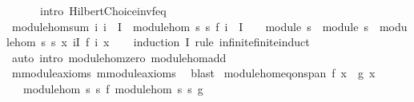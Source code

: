 \begin{isabellebody}
\ \ \ \ \ \ intro{\isacharbang}{\kern0pt}{\isacharcolon}{\kern0pt}\ Hilbert{\isacharunderscore}{\kern0pt}Choice{\isachardot}{\kern0pt}inv{\isacharunderscore}{\kern0pt}f{\isacharunderscore}{\kern0pt}eq{\isacharparenright}{\kern0pt}%
\endisatagproof
{\isafoldproof}%
%
\isadelimproof
\isanewline
%
\endisadelimproof
\isanewline
{}\isamarkupfalse%
\ module{\isacharunderscore}{\kern0pt}hom{\isacharunderscore}{\kern0pt}sum{\isacharcolon}{\kern0pt}\ {\isachardoublequoteopen}{\isacharparenleft}{\kern0pt}{\isasymAnd}i{\isachardot}{\kern0pt}\ i\ {\isasymin}\ I\ {\isasymLongrightarrow}\ module{\isacharunderscore}{\kern0pt}hom\ s{}\ s{}\ {\isacharparenleft}{\kern0pt}f\ i{\isacharparenright}{\kern0pt}{\isacharparenright}{\kern0pt}\ {\isasymLongrightarrow}\ {\isacharparenleft}{\kern0pt}I\ {\isacharequal}{\kern0pt}\ {\isacharbraceleft}{\kern0pt}{\isacharbraceright}{\kern0pt}\ {\isasymLongrightarrow}\ module\ s{}\ {\isasymand}\ module\ s{}{\isacharparenright}{\kern0pt}\ {\isasymLongrightarrow}\ module{\isacharunderscore}{\kern0pt}hom\ s{}\ s{}\ {\isacharparenleft}{\kern0pt}{\isasymlambda}x{\isachardot}{\kern0pt}\ {\isasymSum}i{\isasymin}I{\isachardot}{\kern0pt}\ f\ i\ x{\isacharparenright}{\kern0pt}{\isachardoublequoteclose}\isanewline
%
\isadelimproof
\ \ %
\endisadelimproof
%
\isatagproof
{}\isamarkupfalse%
\ {\isacharparenleft}{\kern0pt}induction\ I\ rule{\isacharcolon}{\kern0pt}\ infinite{\isacharunderscore}{\kern0pt}finite{\isacharunderscore}{\kern0pt}induct{\isacharparenright}{\kern0pt}\isanewline
\ \ \isamarkupfalse%
\ {\isacharparenleft}{\kern0pt}auto\ intro{\isacharbang}{\kern0pt}{\isacharcolon}{\kern0pt}\ module{\isacharunderscore}{\kern0pt}hom{\isacharunderscore}{\kern0pt}zero\ module{\isacharunderscore}{\kern0pt}hom{\isacharunderscore}{\kern0pt}add{\isacharparenright}{\kern0pt}\isanewline
\ \ \isamarkupfalse%
\ m{}{\isachardot}{\kern0pt}module{\isacharunderscore}{\kern0pt}axioms\ m{}{\isachardot}{\kern0pt}module{\isacharunderscore}{\kern0pt}axioms\ \isamarkupfalse%
\ blast%
\endisatagproof
{\isafoldproof}%
%
\isadelimproof
\isanewline
%
\endisadelimproof
\isanewline
{}\isamarkupfalse%
\ module{\isacharunderscore}{\kern0pt}hom{\isacharunderscore}{\kern0pt}eq{\isacharunderscore}{\kern0pt}on{\isacharunderscore}{\kern0pt}span{\isacharcolon}{\kern0pt}\ {\isachardoublequoteopen}f\ x\ {\isacharequal}{\kern0pt}\ g\ x{\isachardoublequoteclose}\isanewline
\ \ \ {\isachardoublequoteopen}module{\isacharunderscore}{\kern0pt}hom\ s{}\ s{}\ f{\isachardoublequoteclose}\ {\isachardoublequoteopen}module{\isacharunderscore}{\kern0pt}hom\ s{}\ s{}\ g{\isachardoublequoteclose}\isanewline

\end{isabellebody}
